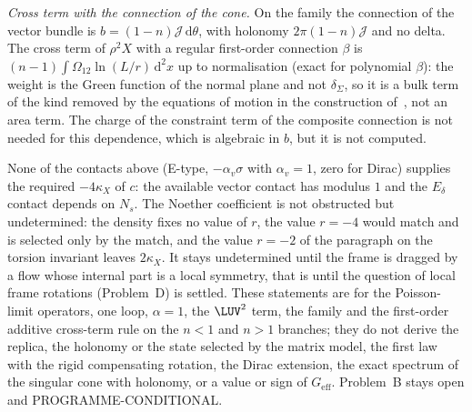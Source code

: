 \emph{Cross term with the connection of the cone.} On the family the connection of the vector bundle is \(b=(1-n)\mathcal J\,\mathrm d\theta\), with holonomy \(2\pi(1-n)\mathcal J\) and no delta. The cross term of \(\rho^2X\) with a regular first-order connection \(\beta\) is \((n-1)\int\Omega_{12}\ln(L/r)\,\mathrm d^2x\) up to normalisation (exact for polynomial \(\beta\)): the weight is the Green function of the normal plane and not \(\delta_\Sigma\), so it is a bulk term of the kind removed by the equations of motion in the construction of~\cite{LewkowyczMaldacena2013}, not an area term. The charge of the constraint term of the composite connection is not needed for this dependence, which is algebraic in \(b\), but it is not computed.

None of the contacts above (E-type, \(-\alpha_v\sigma\) with \(\alpha_v=1\), zero for Dirac) supplies the required \(-4\kappa_X\) of \(c\): the available vector contact has modulus \(1\) and the \(E_\delta\) contact depends on \(N_s\). The Noether coefficient is not obstructed but undetermined: the density fixes no value of \(r\), the value \(r=-4\) would match and is selected only by the match, and the value \(r=-2\) of the paragraph on the torsion invariant leaves \(2\kappa_X\). It stays undetermined until the frame is dragged by a flow whose internal part is a local symmetry, that is until the question of local frame rotations (Problem~D) is settled. These statements are for the Poisson-limit operators, one loop, \(\alpha=1\), the \(\LUV^2\) term, the family and the first-order additive cross-term rule on the \(n<1\) and \(n>1\) branches; they do not derive the replica, the holonomy or the state selected by the matrix model, the first law with the rigid compensating rotation, the Dirac extension, the exact spectrum of the singular cone with holonomy, or a value or sign of \(G_{\mathrm{eff}}\). Problem~B stays open and PROGRAMME-CONDITIONAL.
